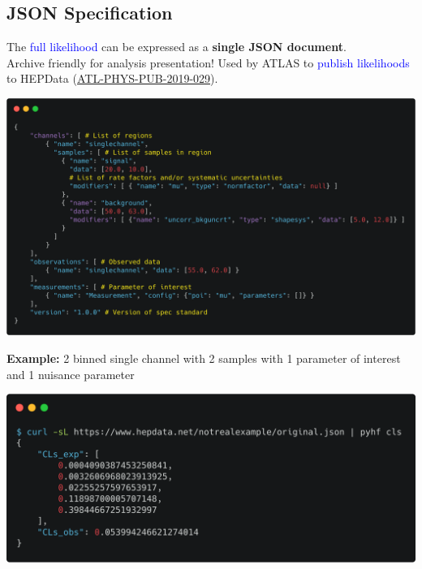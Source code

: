 \documentclass[a0,portrait]{a0poster}
\begin{document}
\begin{multicols}{2}
 \section*{\LARGE\color{MediumBlue} JSON Specification}
 The \textcolor{blue}{full likelihood} can be expressed as a \textbf{single JSON document}.\\Archive friendly for analysis presentation! Used by ATLAS to \textcolor{blue}{publish likelihoods} to HEPData (\textcolor{blue}{\href{https://atlas.web.cern.ch/Atlas/GROUPS/PHYSICS/PUBNOTES/ATL-PHYS-PUB-2019-029/}{ATL-PHYS-PUB-2019-029}}).
 \vspace{0.5em}
 \begin{center}
  \href{https://raw.githubusercontent.com/diana-hep/pyhf/master/examples/2-bin_1-channel.json}{\includegraphics[width=0.7\linewidth]{carbon_JSON_spec_annotated.png}}
 \end{center}
 \vspace{-1em}
 \begin{center}
  {\small\textbf{Example:} 2 binned single channel with 2 samples with 1 parameter of interest and 1 nuisance parameter}
 \end{center}
 \begin{center}
  \includegraphics[width=0.7\linewidth]{carbon_pyhf_CLs.png}
 \end{center}


\end{multicols}
\end{document}
